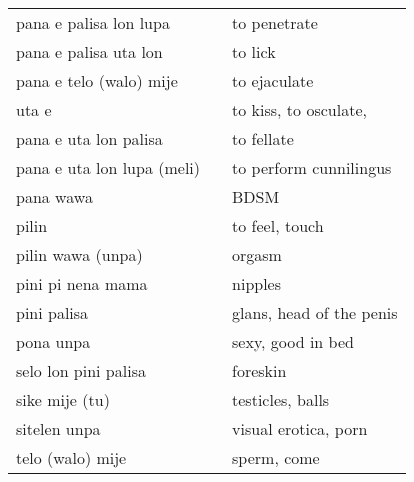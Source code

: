 \begin{supertabular}{p{4,5cm}|ll}
    pana e palisa lon lupa             &  & to penetrate                                                                      \\
    pana e palisa uta lon              &  & to lick                                                                           \\
    pana e telo (walo) mije            &  & to ejaculate                                                                      \\
    uta e                              &  & to kiss, to osculate,                                                             \\
    pana e uta lon palisa              &  & to fellate                                                                        \\
    pana e uta lon lupa (meli)         &  & to perform cunnilingus                                                            \\
    pana wawa                          &  & BDSM                                                                              \\
    pilin                              &  & to feel, touch                                                                    \\
    pilin wawa (unpa)                  &  & orgasm                                                                            \\
    pini pi nena mama                  &  & nipples                                                                           \\
    pini palisa                        &  & glans, head of the penis                                                          \\
    pona unpa                          &  & sexy, good in bed                                                                 \\
    selo lon pini palisa               &  & foreskin                                                                          \\
    sike mije (tu)                     &  & testicles, balls                                                                  \\
    sitelen unpa                       &  & visual erotica, porn                                                              \\
    telo (walo) mije                   &  & sperm, come                                                                       \\

\end{supertabular}
